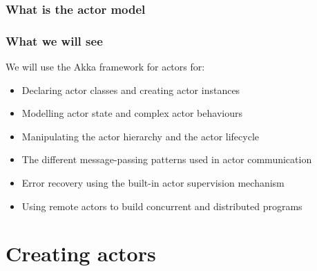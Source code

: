 \documentclass[aspectratio=169]{beamer}
\begin{document}
\begin{frame}\frametitle{What is the actor model}
\end{frame}

\begin{frame}[t]\frametitle{What we will see}

  We will use the Akka framework for actors for:
  \begin{itemize}
    \item Declaring \alert{actor classes} and creating \alert{actor instances}
    \item Modelling \alert{actor state} and complex \alert{actor behaviours}
    \item Manipulating the \alert{actor hierarchy} and the \alert{actor lifecycle}
    \item The different message-passing patterns used in \alert{actor communication}
    \item Error recovery using the built-in \alert{actor supervision} mechanism
    \item Using \alert{remote actors} to build concurrent and distributed programs
  \end{itemize}


\end{frame}


\section{Creating actors}
\end{document}

